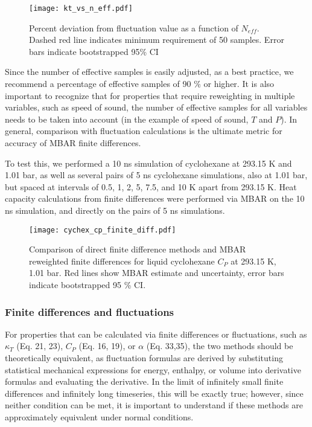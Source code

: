 \documentclass[aps,pre,twocolumn,nofootinbib,superscriptaddress,linenumbers,10pt, draft,tightenlines]{revtex4-1}
\begin{document}
\begin{figure}[H]
\texttt{[image: kt\_vs\_n\_eff.pdf]}
\caption{Percent deviation from fluctuation value as a function of $N_{eff}$.  Dashed red line indicates minimum requirement of 50 samples.  Error bars indicate bootstrapped 95\% CI}
\end{figure}

  Since the number of effective samples is easily adjusted, as a best practice, we recommend a percentage of effective samples of 90 \% or higher.  It is also important to recognize that for properties that require reweighting in multiple variables, such as speed of sound, the number of effective samples for all variables needs to be taken into account (in the example of speed of sound, $T$ and $P$).  In general, comparison with fluctuation calculations is the ultimate metric for accuracy of MBAR finite differences.

To test this, we performed a 10 ns simulation of cyclohexane at 293.15 K and 1.01 bar, as well as several pairs of 5 ns cyclohexane simulations, also at 1.01 bar, but spaced at intervals of 0.5, 1, 2, 5, 7.5, and 10 K apart from 293.15 K. Heat capacity calculations from finite differences were performed via MBAR on the 10 ns simulation, and directly on the pairs of 5 ns simulations. 
\begin{figure}[H]
\texttt{[image: cychex\_cp\_finite\_diff.pdf]}
\caption{Comparison of direct finite difference methods and MBAR reweighted finite differences for liquid cyclohexane $C_P$ at 293.15 K, 1.01 bar. Red lines show MBAR estimate and uncertainty, error bars indicate bootstrapped 95 \% CI.} 
\end{figure}

\subsubsection{Finite differences and fluctuations}

For properties that can be calculated via finite differences or fluctuations, such as $\kappa_T$ (Eq. 21, 23), $C_P$ (Eq. 16, 19), or $\alpha$ (Eq. 33,35), the two methods should be theoretically equivalent, as fluctuation formulas are derived by substituting statistical mechanical expressions for energy, enthalpy, or volume into derivative formulas and evaluating the derivative.  In the limit of infinitely small finite differences and infinitely long timeseries, this will be exactly true; however, since neither condition can be met, it is important to understand if these methods are approximately equivalent under normal conditions.
\end{document}
